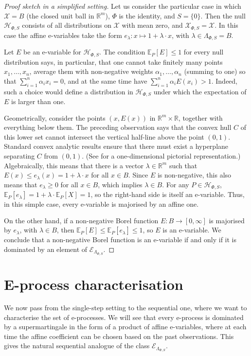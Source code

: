 \documentclass[10pt, a4paper]{article}
\newcommand{\E}{\mathbb E}
\newcommand{\e}{e}
\newcommand{\Ee}{\mathcal E}
\newcommand{\EeP}{\Ee_{\LP}}
\newcommand{\Hh}{\mathcal H}
\newcommand{\HhP}{\Hh_{\Phi,S}}
\newcommand{\LP}{\Lambda_{\Phi,S}}
\newcommand{\R}{\mathbb R}
\newcommand{\X}{\mathcal X}
\newcommand{\XP}{\X_{\Phi,S}}
\begin{document}
\begin{proof}[Proof sketch in a simplified setting]
    Let us consider the particular case in which $\X =B$ (the closed unit ball in $\R^m$), $\Phi$ is the identity, and $S=\{0\}$. Then the null $\HhP$ consists of all distributions on $\X$ with mean zero, and $\XP=\X$. In this case the affine e-variables take the form $\e_\lambda:x\mapsto 1+\lambda\cdot x$, with $\lambda\in\LP=B$.
    
    Let $E$ be an e-variable for $\HhP$. The condition $\E_P[E]\leq1$ for every null distribution says, in particular, that one cannot take finitely many points $x_1,\dots,x_n$, average them with non-negative weights $\alpha_1,\dots,\alpha_n$ (summing to one) so that $\sum_{i=1}^n \alpha_i x_i=0$, and at the same time have $\sum_{i=1}^n \alpha_i E(x_i)>1$. Indeed, such a choice would define a distribution in $\HhP$ under which the expectation of $E$ is larger than one.
    
    Geometrically, consider the points $(x,E(x))$ in $\R^m\times\R$, together with everything below them. The preceding observation says that the convex hull $C$ of this lower set cannot intersect the vertical half-line above the point $(0,1)$. Standard convex analytic results ensure that there must exist a hyperplane separating $C$ from $(0,1)$. (See  for a one-dimensional pictorial representation.) Algebraically, this means that there is a vector $\lambda\in\R^m$ such that $E(x)\leq \e_\lambda(x) = 1+\lambda\cdot x$ for all $x\in B$. Since $E$ is non-negative, this also means that $\e_\lambda\geq0$ for all $x\in B$, which implies $\lambda\in B$. For any $P\in\HhP$, $\E_P[\e_\lambda] = 1 + \lambda\cdot\E_P[X]=1$, so the right-hand side is itself an e-variable. Thus, in this simple case, every e-variable is majorised by an affine one.

    On the other hand, if a non-negative Borel function $E:B\to[0,\infty]$ is majorised by $\e_\lambda$, with $\lambda\in B$, then $\E_P[E]\leq\E_P[\e_\lambda]\leq 1$, so $E$ is an e-variable. We conclude that a non-negative Borel function is an e-variable if and only if it is dominated by an element of $\EeP$.
\end{proof}

\section{E-process characterisation}

We now pass from the single-step setting to the sequential one, where we want to characterise the set of e-processes. We will see that every e-process is dominated by a supermartingale in the form of a product of affine e-variables, where at each time the affine coefficient can be chosen based on the  past observations. This gives the natural sequential analogue of the class $\EeP$.
\end{document}
